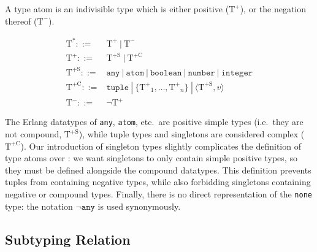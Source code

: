 \documentclass[nonacm,timestamp,manuscript]{acmart}
\newcommand{\alt}{\ |\ }
\newcommand{\atom}[1]{\texttt{#1}}
\newcommand{\singleton}[2]{\langle #1, #2 \rangle} %
\newcommand{\type}{\text{T}}
\newcommand{\atomtype}{{\type}^{*}}
\newcommand{\postype}{{\type}^{+}}
\newcommand{\posstype}{{\type}^{+\text{S}}}
\newcommand{\posctype}{{\type}^{+\text{C}}}
\newcommand{\negtype}{{\type}^{-}}
\begin{document}
\begin{definition}
  A type atom is an indivisible type which is either positive
  ($\postype$), or the negation thereof ($\negtype$).

\begin{align*}
  \atomtype ::={}& \postype \alt \negtype \\
  \postype ::={}& \posstype \alt \posctype \\
  \posstype ::={}& \atom{any} \alt \atom{atom} \alt \atom{boolean} \alt
                   \atom{number} \alt \atom{integer} \\
  \posctype ::={}& \atom{tuple} \alt \{ {\postype}_{1}, \ldots, {\postype}_{n} \}
                   \alt \singleton{\posstype}{v} \\
  \negtype ::={}& \neg \postype
\end{align*}
\end{definition}

The Erlang datatypes of \atom{any}, \atom{atom}, etc.\ are positive simple types
(i.e.\ they are not compound, $\posstype$), while tuple types and singletons are
considered complex ($\posctype$). Our introduction of singleton types slightly
complicates the definition of type atoms over \citeauthor{Pearce2013}: we want
singletons to only contain simple positive types, so they must be defined
alongside the compound datatypes. This definition prevents tuples from
containing negative types, while also forbidding singletons containing
negative or compound types. Finally, there is no direct representation of the
\atom{none} type: the notation $\neg \atom{any}$ is used synonymously.

\subsection{Subtyping Relation}
\end{document}

